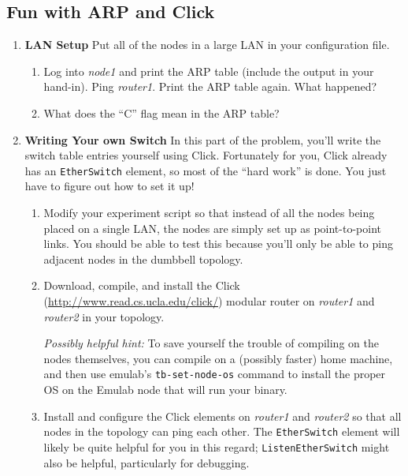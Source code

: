 \documentclass[11pt]{article}
\begin{document}
\subsection*{Fun with ARP and Click}

\begin{enumerate}
\itemsep=-1pt
\item{\bf LAN Setup} Put all of the nodes in a large LAN in your
  configuration file.  
  \begin{enumerate}
    \item Log into {\em node1} and print the ARP table (include the
      output in your hand-in).  Ping {\em router1}.  Print the ARP table
      again.  What happened?
    \item What does the ``C'' flag mean in the ARP table?
  \end{enumerate}

\item{\bf Writing Your own Switch} In this part of the problem, you'll
  write the switch table entries yourself using Click.  Fortunately for
  you, Click already has an {\tt EtherSwitch} element, so most of the
  ``hard work'' is done.  You just have to figure out how to set it up!

  \begin{enumerate}
    \item Modify your experiment script so that instead of all the nodes
      being placed on a single LAN, the nodes are simply set up as
      point-to-point links.  You should be able to test this because
      you'll only be able to ping adjacent nodes in the dumbbell
      topology.
    \item Download, compile, and install the Click
      (\url{http://www.read.cs.ucla.edu/click/}) modular
      router on {\em router1} and {\em router2} in your topology.

      {\em Possibly helpful hint:} To save yourself the trouble of
      compiling on the nodes themselves, you can compile on a (possibly
      faster) home machine, and then use emulab's {\tt tb-set-node-os}
      command to install the proper OS on the Emulab node that will run
      your binary.

    \item Install and configure the Click elements on {\em router1} and
      {\em router2} so that all nodes in the topology can ping each
      other.  The {\tt EtherSwitch} element will likely be quite helpful
      for you in this regard; {\tt ListenEtherSwitch} might also be
      helpful, particularly for debugging.
  \end{enumerate}


\end{enumerate}
\end{document}
